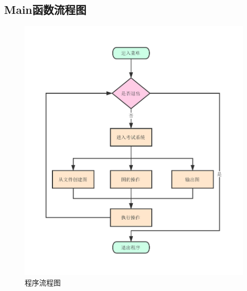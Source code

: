 \subsection{Main函数流程图}

\begin{figure}[H]
    \centering
    \includegraphics[width=0.6\linewidth]{figures/flowchart}
    \caption{程序流程图}
    \label{fig:flowchart}
\end{figure}

